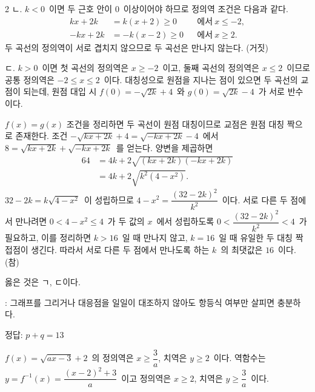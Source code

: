 \documentclass[10pt,fleqn]{article}
\begin{document}
\begin{multicols*}{2}
\vspace{3mm}
ㄴ. $k < 0$\ 이면 두 근호 안이 $0$\ 이상이어야 하므로 정의역 조건은 다음과 같다.
\begin{align*}
  kx + 2k &= k(x + 2) \ge 0 &&\text{에서}\ x \le -2,\\
  -kx + 2k &= -k(x - 2) \ge 0 &&\text{에서}\ x \ge 2.
\end{align*}
두 곡선의 정의역이 서로 겹치지 않으므로 두 곡선은 만나지 않는다. (거짓)

\vspace{3mm}
ㄷ. $k > 0$\ 이면 첫 곡선의 정의역은 $x \ge -2$\ 이고, 둘째 곡선의 정의역은 $x \le 2$\ 이므로 공통 정의역은 $-2 \le x \le 2$\ 이다. 대칭성으로 원점을 지나는 점이 있으면 두 곡선의 교점이 되는데, 원점 대입 시 $f(0) = -\sqrt{2k} + 4$\ 와 $g(0) = \sqrt{2k} - 4$\ 가 서로 반수이다.

$f(x) = g(x)$ 조건을 정리하면 두 곡선이 원점 대칭이므로 교점은 원점 대칭 짝으로 존재한다. 조건 $-\sqrt{kx + 2k} + 4 = \sqrt{-kx + 2k} - 4$\ 에서 $8 = \sqrt{kx + 2k} + \sqrt{-kx + 2k}$\ 를 얻는다. 양변을 제곱하면
\begin{align*}
64 &= 4k + 2\sqrt{(kx + 2k)(-kx + 2k)} \\
&= 4k + 2\sqrt{k^{2}(4 - x^{2})}.
\end{align*}
$32 - 2k = k\sqrt{4 - x^{2}}$\ 이 성립하므로 $4 - x^{2} = \dfrac{(32 - 2k)^{2}}{k^{2}}$\ 이다. 서로 다른 두 점에서 만나려면 $0 < 4 - x^{2} \le 4$\ 가 두 값의 $x$\ 에서 성립하도록 $0 < \dfrac{(32 - 2k)^{2}}{k^{2}} < 4$\ 가 필요하고, 이를 정리하면 $k > 16$\ 일 때 만나지 않고, $k = 16$\ 일 때 유일한 두 대칭 짝 접점이 생긴다. 따라서 서로 다른 두 점에서 만나도록 하는 $k$\ 의 최댓값은 $16$\ 이다. (참)

\vspace{3mm}
옳은 것은 ㄱ, ㄷ이다.

\begin{dmcriticalpoint}
: 그래프를 그리거나 대응점을 일일이 대조하지 않아도 항등식 여부만 살피면 충분하다.
\end{dmcriticalpoint}

\begin{dmanswerbox}정답: $p + q = 13$\end{dmanswerbox}

$f(x) = \sqrt{ax - 3} + 2$\ 의 정의역은 $x \ge \dfrac{3}{a}$, 치역은 $y \ge 2$\ 이다. 역함수는 $y = f^{-1}(x) = \dfrac{(x - 2)^{2} + 3}{a}$\ 이고 정의역은 $x \ge 2$, 치역은 $y \ge \dfrac{3}{a}$\ 이다.


\end{multicols*}
\end{document}
